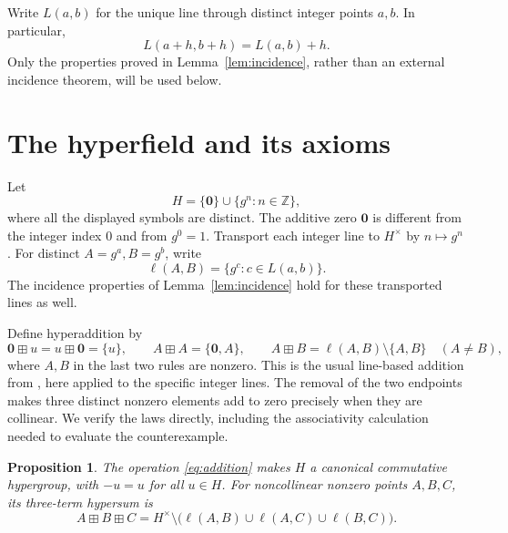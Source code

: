 \documentclass[11pt]{article}
\newtheorem{proposition}[theorem]{Proposition}
\theoremstyle{remark}
\newcommand{\Z}{\mathbb Z}
\newcommand{\hz}{\mathbf 0}
\newcommand{\hs}{\boxplus}
\begin{document}
Write $L(a,b)$ for the unique line through distinct integer points
$a,b$. In particular,
\begin{equation}\label{eq:translation}
 L(a+h,b+h)=L(a,b)+h.
\end{equation}
Only the properties proved in Lemma~\ref{lem:incidence}, rather than an
external incidence theorem, will be used below.

\section{The hyperfield and its axioms}\label{sec:hyperfield}

Let
\[
 H=\{\hz\}\cup\{g^n:n\in\Z\},
\]
where all the displayed symbols are distinct. The additive zero $\hz$
is different from the integer index $0$ and from $g^0=1$.
Transport each integer line to $H^\times$ by $n\mapsto g^n$.
For distinct $A=g^a,B=g^b$, write
\[
 \ell(A,B)=\{g^c:c\in L(a,b)\}.
\]
The incidence properties of Lemma~\ref{lem:incidence} hold for these
transported lines as well.

Define hyperaddition by
\begin{equation}\label{eq:addition}
 \hz\hs u=u\hs\hz=\{u\},\qquad
 A\hs A=\{\hz,A\},\qquad
 A\hs B=\ell(A,B)\setminus\{A,B\}\quad(A\ne B),
\end{equation}
where $A,B$ in the last two rules are nonzero. This is the usual
line-based addition from \cite[Proposition~3.1]{CC}, here applied to the
specific integer lines. The removal of the two endpoints makes three
distinct nonzero elements add to zero precisely when they are collinear.
We verify the laws directly, including the associativity calculation
needed to evaluate the counterexample.

\begin{proposition}\label{prop:hypergroup}
The operation \eqref{eq:addition} makes $H$ a canonical commutative
hypergroup, with $-u=u$ for all $u\in H$. For noncollinear nonzero points
$A,B,C$, its three-term hypersum is
\begin{equation}\label{eq:triangle}
 A\hs B\hs C
 =H^\times\setminus\bigl(\ell(A,B)\cup\ell(A,C)\cup\ell(B,C)\bigr).
\end{equation}
\end{proposition}
\end{document}

